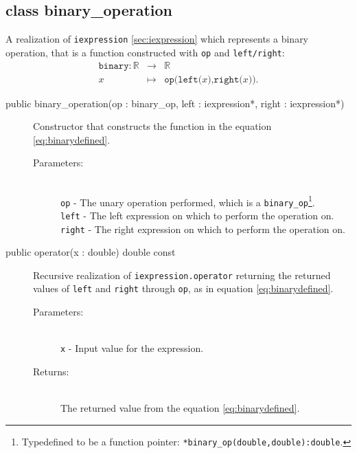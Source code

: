 \documentclass[a4paper,11pt]{kth-mag}
\newcommand{\RR}{\ensuremath{\mathbb{R}}}
\begin{document}
\subsection{class binary\_operation} A realization of \texttt{iexpression}
\ref{sec:iexpression} which represents a binary operation, that is a function
constructed with \texttt{op} and \texttt{left/right}:
\begin{eqnarray}
    \label{eq:binarydefined}
    \texttt{binary}: \RR &\rightarrow& \RR \nonumber \\
    x &\mapsto& \texttt{op(left(}x\texttt{),right(}x\texttt{))}.
\end{eqnarray}
\begin{description}
    \item[public binary\_operation(op : binary\_op, left : iexpression*, right :
    iexpression*)] Constructor that constructs the function in the equation
    \ref{eq:binarydefined}. 
    \begin{description}
        \item[Parameters:]~\\
            \verb+op+ - The unary operation performed, which is a
            \texttt{binary\_op}\footnote{Typedefined to
            be a function pointer: \texttt{*binary\_op(double,double):double}.}.\\
            \verb+left+ - The left expression on which to perform the
            operation on. \\
            \verb+right+ - The right expression on which to perform the
            operation on.
    \end{description}
\end{description}
\begin{description}
    \item[public operator(x : double) double const] 
    Recursive realization of \texttt{iexpression.operator} returning the
    returned values of \texttt{left} and \texttt{right} through \texttt{op},
    as in equation \ref{eq:binarydefined}.
    \begin{description}
        \item[Parameters:]~\\
            \verb+x+ - Input value for the expression.
        \item[Returns:]~\\
            The returned value from the equation \ref{eq:binarydefined}.
    \end{description}
\end{description}
\end{document}
